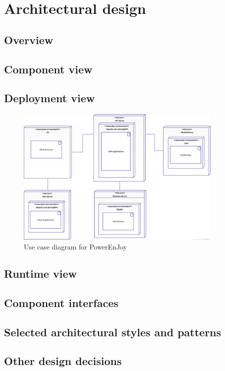 \chapter{Architectural design}

\section{Overview}

\section{Component view}

\section{Deployment view}
\begin{figure}[t]
	\centering
	\includegraphics[height=6.7cm,keepaspectratio]{figures/deployment_view.eps}
	\caption{Use case diagram for PowerEnJoy}
	\label{fig:deployment_view}
\end{figure}

\section{Runtime view}

\section{Component interfaces}

\section{Selected architectural styles and patterns}

\section{Other design decisions}

